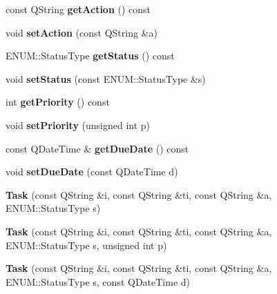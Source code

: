 \begin{DoxyCompactItemize}
\item 
\mbox{\label{class_task_a96c7968f19216f99d2be8258379276f8}} 
const Q\+String {\bfseries get\+Action} () const
\item 
\mbox{\label{class_task_ab46558546f384adf2fb713a65d38c075}} 
void {\bfseries set\+Action} (const Q\+String \&a)
\item 
\mbox{\label{class_task_aad7d467ac985d8244ac86d1359652056}} 
E\+N\+U\+M\+::\+Status\+Type {\bfseries get\+Status} () const
\item 
\mbox{\label{class_task_a16849e80ace9effc32551461b4cc9633}} 
void {\bfseries set\+Status} (const E\+N\+U\+M\+::\+Status\+Type \&s)
\item 
\mbox{\label{class_task_adf87b0c5cebcf623ecf56cea17c6fede}} 
int {\bfseries get\+Priority} () const
\item 
\mbox{\label{class_task_ada0cc34c125efd9fc373d3ca25be6013}} 
void {\bfseries set\+Priority} (unsigned int p)
\item 
\mbox{\label{class_task_aebc4bcb056771f66180b3cffe91d17c3}} 
const Q\+Date\+Time \& {\bfseries get\+Due\+Date} () const
\item 
\mbox{\label{class_task_a8867a97698ad38810e3d53a924b4c1b3}} 
void {\bfseries set\+Due\+Date} (const Q\+Date\+Time d)
\item 
\mbox{\label{class_task_a78d0578c5477a26b89dc2db1dd4752e2}} 
{\bfseries Task} (const Q\+String \&i, const Q\+String \&ti, const Q\+String \&a, E\+N\+U\+M\+::\+Status\+Type s)
\item 
\mbox{\label{class_task_ac2c486f798fcdc263a77420448f9e276}} 
{\bfseries Task} (const Q\+String \&i, const Q\+String \&ti, const Q\+String \&a, E\+N\+U\+M\+::\+Status\+Type s, unsigned int p)
\item 
\mbox{\label{class_task_a95bb17f3748a1195967d92e73bba8c7c}} 
{\bfseries Task} (const Q\+String \&i, const Q\+String \&ti, const Q\+String \&a, E\+N\+U\+M\+::\+Status\+Type s, const Q\+Date\+Time d)

\end{DoxyCompactItemize}
